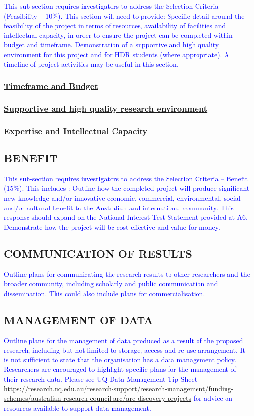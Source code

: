 \documentclass[12pt,a4paper]{article}
\newcommand{\rules}[1]{\textcolor{blue}{#1}}
\newcommand*{\TitleFont}{%
      \usefont{\encodingdefault}{\rmdefault}{b}{n}%
      \fontsize{12}{12}%
      \selectfont}
\begin{document}
\rules{This sub-section requires investigators to address the Selection Criteria (Feasibility – 10\%). This section will need to provide: Specific detail around the feasibility of the project in terms of resources, availability of facilities and intellectual capacity, in order to ensure the project can be completed within budget and timeframe. Demonstration of a supportive and high quality environment for this project and for HDR students (where appropriate). A timeline of project activities may be useful in this section.}
\subsubsection*{\underline{Timeframe and Budget}}
 \subsubsection*{\underline{Supportive and high quality research environment}} 
  \subsubsection*{\underline{Expertise and Intellectual Capacity}} 

\subsection*{\TitleFont BENEFIT}
\rules{This sub-section requires investigators to address the Selection Criteria – Benefit (15\%). This includes : Outline how the completed project will produce significant new knowledge and/or innovative economic, commercial, environmental, social and/or cultural benefit to the Australian and international community. 
This response should expand on the National Interest Test Statement provided at A6. 
Demonstrate how the project will be cost-effective and value for money.
}


\subsection*{\TitleFont COMMUNICATION OF RESULTS}
\rules{Outline plans for communicating the research results to other researchers and the broader community, including scholarly and public communication and dissemination. This could also include plans for commercialisation.}

\subsection*{\TitleFont MANAGEMENT OF DATA}
\rules{ Outline plans for the management of data produced as a result of the proposed research, including but not limited to storage, access and re-use arrangement.
 It is not sufficient to state that the organisation has a data management policy. Researchers are encouraged to highlight specific plans for the management of their research data. Please see UQ Data Management Tip Sheet \url{https://research.uq.edu.au/research-support/research-management/funding-schemes/australian-research-council-arc/arc-discovery-projects} for advice on resources available to support data management.
}
\end{document}
